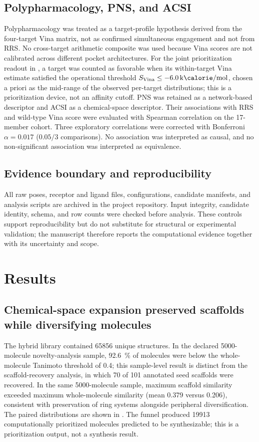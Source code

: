 \documentclass[journal=jcisd8,manuscript=article]{achemso}
\begin{document}
\subsection{Polypharmacology, PNS, and ACSI}
Polypharmacology was treated as a target-profile hypothesis derived from the four-target Vina matrix, not as confirmed simultaneous engagement and not from RRS. No cross-target arithmetic composite was used because Vina scores are not calibrated across different pocket architectures. For the joint prioritization readout in , a target was counted as favorable when its within-target Vina estimate satisfied the operational threshold $S_{\mathrm{Vina}}\leq\qty{-6.0}{\kilo\calorie\per\mole}$, chosen a priori as the mid-range of the observed per-target distributions; this is a prioritization device, not an affinity cutoff. PNS was retained as a network-based descriptor and ACSI as a chemical-space descriptor. Their associations with RRS and wild-type Vina score were evaluated with Spearman correlation on the 17-member cohort. Three exploratory correlations were corrected with Bonferroni $\alpha=\num{0.017}$ ($\num{0.05}/\num{3}$ comparisons). No association was interpreted as causal, and no non-significant association was interpreted as equivalence.

\subsection{Evidence boundary and reproducibility}
All raw poses, receptor and ligand files, configurations, candidate manifests, and analysis scripts are archived in the project repository. Input integrity, candidate identity, schema, and row counts were checked before analysis. These controls support reproducibility but do not substitute for structural or experimental validation; the manuscript therefore reports the computational evidence together with its uncertainty and scope.

\section{Results}
\subsection{Chemical-space expansion preserved scaffolds while diversifying molecules}
The hybrid library contained \num{65856} unique structures. In the declared \num{5000}-molecule novelty-analysis sample, \qty{92.6}{\percent} of molecules were below the whole-molecule Tanimoto threshold of \num{0.4}; this sample-level result is distinct from the scaffold-recovery analysis, in which \num{70} of \num{101} annotated seed scaffolds were recovered. In the same \num{5000}-molecule sample, maximum scaffold similarity exceeded maximum whole-molecule similarity (mean \num{0.379} versus \num{0.206}), consistent with preservation of ring systems alongside peripheral diversification. The paired distributions are shown in . The funnel produced \num{19913} computationally prioritized molecules predicted to be synthesizable; this is a prioritization output, not a synthesis result.
\end{document}
